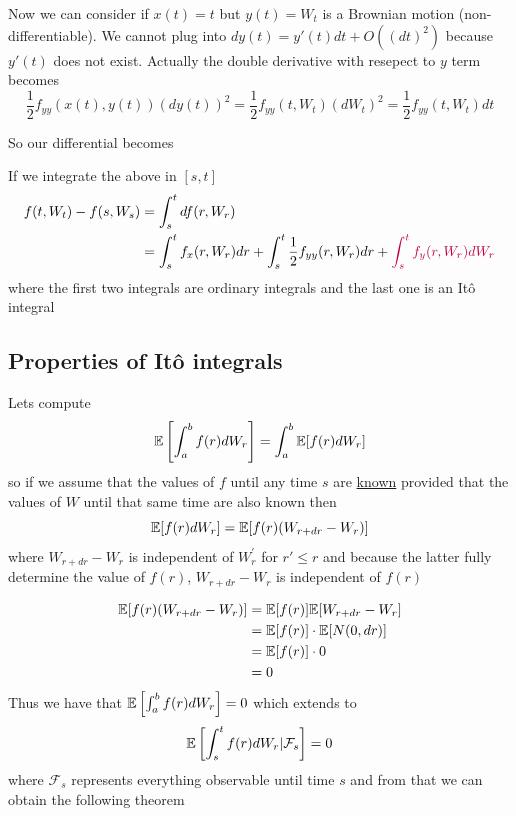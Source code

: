 \documentclass[oneside]{book}
\begin{document}
    Now we can consider if $x(t) = t$ but $y(t) = W_t$ is a Brownian motion (non-differentiable). We cannot plug into
    $dy(t) = y'(t)dt + O((dt)^2)$ because $y'(t)$ does not exist. Actually the double derivative with resepect to $y$
    term becomes
    $$
    \frac{1}{2}f_{yy}(x(t),y(t))(dy(t))^2 = \frac{1}{2}f_{yy}(t, W_t)(dW_t)^2 = \frac{1}{2}f_{yy}(t, W_t)dt
    $$


    So our differential becomes


    If we integrate the above in $[s,t]$
    \begin{align*}
        f(t, W_t) - f(s, W_s) &= \int_s^t df(r, W_r) \\
                              &= \int_s^t f_x(r, W_r)dr + \int_s^t \frac{1}{2}f_{yy}(r, W_r)dr + {\color{purple}\int_s^t f_y(r, W_r)dW_r} \\
    \end{align*}
    where the first two integrals are ordinary integrals and the last one is an {\color{purple}Itô integral}
    \subsection*{Properties of {\color{purple}Itô integrals}}
    Lets compute
    $$
    \mathbb{E}\left[\int_a^b f(r)dW_r\right] = \int_a^b \mathbb{E}[f(r)dW_r]
    $$
    so if we assume that the values of $f$ until any time $s$ are \underline{known} provided that the values of $W$ until
    that same time are also known then
    $$
    \mathbb{E}[f(r)dW_r] = \mathbb{E}[f(r)(W_{r+dr} - W_r)]
    $$
    where $W_{r+dr} - W_r$ is independent of $W_r^'$ for $r' \leq r$ and because the latter fully determine the value of
    $f(r)$, $W_{r+dr} - W_r$ is independent of $f(r)$

    \begin{align*}
        \mathbb{E}[f(r)(W_{r+dr} - W_r)] &= \mathbb{E}[f(r)]\mathbb{E}[W_{r+dr} - W_r] \\
                                 &= \mathbb{E}[f(r)]\cdot \mathbb{E}[N(0, dr)] \\
                                 &= \mathbb{E}[f(r)]\cdot 0 \\
                                 &= 0
    \end{align*}
    \break
    Thus we have that $\mathbb{E}\left[\int_a^b f(r)dW_r\right] = 0$ which extends to $$\mathbb{E}\left[\int_s^t f(r)dW_r | \mathcal{F}_s\right] = 0$$
    where $\mathcal{F}_s$ represents everything observable until time $s$ and from that we can obtain the following theorem
\end{document}
